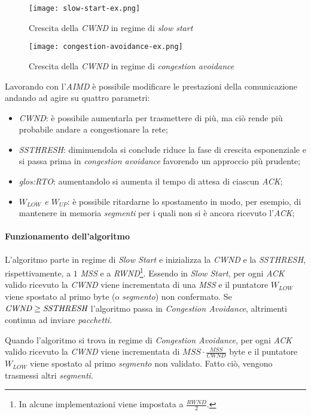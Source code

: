 \begin{figure}[ht]
    \centering
    \texttt{[image: slow-start-ex.png]}
    \caption{Crescita della \emph{CWND} in regime di \emph{slow start}}
\end{figure}
\newpage
\begin{figure}[h!]
    \centering
    \texttt{[image: congestion-avoidance-ex.png]}
    \caption{Crescita della \emph{CWND} in regime di \emph{congestion avoidance}}
\end{figure}\noindent
Lavorando con l'\emph{AIMD} è possibile modificare le prestazioni della
comunicazione andando ad agire su quattro parametri:
\begin{itemize}
    \item \emph{CWND}: è possibile aumentarla per trasmettere di più, ma ciò
    rende più probabile andare a congestionare la rete;
    \item \emph{SSTHRESH}: diminuendola si conclude riduce la fase di crescita
    esponenziale e si passa prima in \emph{congestion avoidance} favorendo
    un approccio più prudente;
    \item \emph{\emph{\gls{glos:RTO}}}: aumentandolo si aumenta il tempo di
    attesa di ciascun \emph{ACK};
    \item \emph{$W_{LOW}$ e $W_{UP}$}: è possibile ritardarne lo spostamento in
    modo, per esempio, di mantenere in memoria \emph{segmenti} per i quali non
    si è ancora ricevuto l'\emph{ACK};
\end{itemize}

\paragraph{Funzionamento dell'algoritmo}
L'algoritmo parte in regime di \emph{Slow Start} e inizializza la \emph{CWND}
e la \emph{SSTHRESH}, rispettivamente, a $1$ \emph{MSS} e a \emph{RWND}\footnote
{In alcune implementazioni viene impostata a $\frac{RWND}{2}$.}.
Essendo in \emph{Slow Start}, per ogni \emph{ACK} valido ricevuto la \emph{CWND}
viene incrementata di una \emph{MSS} e il puntatore $W_{LOW}$ viene spostato al
primo byte (o \emph{segmento}) non confermato.
Se $\emph{CWND}\geq\emph{SSTHRESH}$ l'algoritmo passa in \emph{Congestion
Avoidance}, altrimenti continua ad inviare \emph{pacchetti}.

Quando l'algoritmo si trova in regime di \emph{Congestion Avoidance},
per ogni \emph{ACK} valido ricevuto la \emph{CWND} viene incrementata di
$MSS\cdot\frac{MSS}{CWND}$ byte e il puntatore $W_{LOW}$ viene spostato al
primo \emph{segmento} non validato. Fatto ciò, vengono trasmessi altri
\emph{segmenti}.

